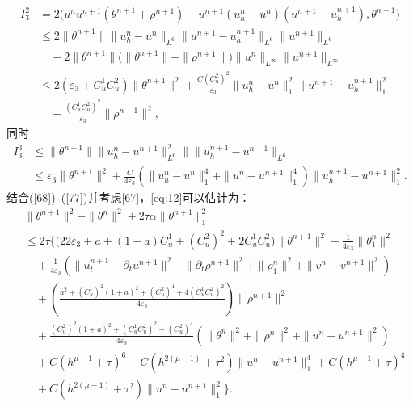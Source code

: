 \documentclass[twoside,UTF8]{nputhesis}
\begin{document}
\begin{equation}
\begin{split}
I_3^2&=\!2\big(u^nu^{n+1}(\theta^{n+1}\!+\!\rho^{n+1})\!-u^{n+1}(u^n_h-u^n)(u^{n+1}\!-\!u^{n+1}_h),\theta^{n+1}\big)\\
&\leq2\parallel \theta^{n+1}\parallel\parallel u^n_h-u^n\parallel_{L^6}\parallel u^{n+1}-u^{n+1}_h\parallel_{L^6}\parallel u^{n+1}\parallel_{L^6}\\
&\quad+2\parallel \theta^{n+1}\parallel\big(\parallel \theta^{n+1}\parallel+\parallel \rho^{n+1}\parallel\big)\parallel u^n\parallel_{L^\infty}\parallel u^{n+1}\parallel_{L^\infty}\\
&\leq2(\varepsilon_3+C_u^1C_u^2)\| \theta^{n+1}\|^2+\frac{C(C_u^2)^2}{\varepsilon_3}\| u^n_h-u^n\|^2_1\| u^{n+1}-u^{n+1}_h\|^2_1\\
&\quad+\frac{(C_u^1C_u^2)^2}{\varepsilon_3}\|\rho^{n+1}\|^2,
\label{76}
\end{split}
\end{equation}
同时
\begin{equation}
\begin{split}
I_3^3&\leq\parallel \theta^{n+1}\parallel\parallel u^n_h-u^{n+1}\parallel^2_{L^6}\parallel\parallel u^{n+1}_h-u^{n+1}\parallel_{L^6}\\
&\leq\varepsilon_3\parallel \theta^{n+1}\parallel^2+\frac{C}{4\varepsilon_3}(\parallel u^n_h-u^n\parallel^4_1+\parallel u^n-u^{n+1}\parallel^4_1)\parallel u^{n+1}_h-u^{n+1}\parallel^2_1.
\label{77}
\end{split}
\end{equation}
结合(\ref{68})--(\ref{77})并考虑\eqref{67}，\eqref{eq:12}可以估计为：
\begin{equation}
\begin{split}
&\| \theta^{n+1}\|^2-\| \theta^n\|^2+2\tau\alpha\|\theta^{n+1}\|_1^2\\
&\leq 2\tau\Big\{\big(22\varepsilon_3+a+(1+a)C_u^1+(C_u^2)^2+2C_u^1C_u^2\big)\| \theta^{n+1}\|^2+\frac{1}{4\varepsilon_3}\|\theta^n_1\|^2\\
&\quad+\frac{1}{4\varepsilon_3}(\| u_t^{n+1}-\bar{\partial}_tu^{n+1}\|^2
+\|\bar{\partial}_t\rho^{n+1}\|^2+\| \rho^n_1\|^2+\| v^n-v^{n+1}\|^2)\\
&\quad+(\frac{a^2+(C_u^1)^2(1+a)^2+(C_u^2)^4+4(C_u^1C_u^2)^2}{4\varepsilon_3})\| \rho^{n+1}\|^2\\
&\quad+\frac{(C_u^2)^2(1+a)^2+(C_u^1C_u^2)^2+(C_u^2)^4}{4\varepsilon_3}(\parallel \theta^n\parallel^2+\| \rho^n\|^2+\| u^n-u^{n+1}\|^2)\\
&\quad +C(h^{\mu-1}+\tau)^6+C(h^{2(\mu-1)}\!+\!\tau^2)\parallel u^n-u^{n+1}\parallel^4_1+C(h^{\mu-1}+\tau)^4\\
&\quad +C(h^{2(\mu-1)}+\tau^2)\|u^n-u^{n+1}\|_1^2\Big\}.
\label{78}
\end{split}
\end{equation}
\end{document}
